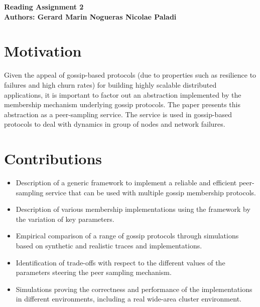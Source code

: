 \documentclass[10pt]{proc}
\begin{document}
\large{\textbf{Reading Assignment 2}}\\
\large{\textbf{Authors: Gerard Marin Nogueras \newline Nicolae Paladi}}\\
\section{Motivation}
Given the appeal of gossip-based protocols (due to properties such as resilience to failures and high churn rates) for building highly scalable distributed applications, it is important to factor out an abstraction implemented by the membership mechanism underlying gossip protocols. The paper presents this abstraction as a peer-sampling service. The service is used in gossip-based protocols to deal with dynamics in group of nodes and network failures. 

\section{Contributions}
\begin{itemize}
\item Description of a generic framework to implement a reliable and efficient peer-sampling service that can be used with multiple gossip membership protocols. 
\item Description of various membership implementations using the framework by the variation of key parameters.
\item Empirical comparison of a range of gossip protocols through simulations based on synthetic and realistic traces and implementations.
\item Identification of trade-offs with respect to the different values of the parameters steering the peer sampling mechanism.
\item Simulations proving the correctness and performance of the implementations in different environments, including a real wide-area cluster environment.
\end{itemize}
\end{document}
